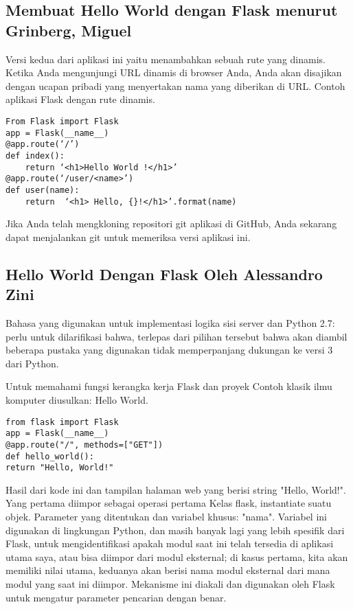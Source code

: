 \documentclass[12pt]{article}
\begin{document}
\subsection{Membuat Hello World dengan Flask menurut Grinberg, Miguel}
Versi kedua dari aplikasi ini yaitu menambahkan sebuah rute yang dinamis. Ketika Anda mengunjungi URL dinamis di browser Anda, Anda akan disajikan dengan ucapan pribadi yang menyertakan nama yang diberikan di URL. Contoh aplikasi Flask dengan rute dinamis.
\begin{verbatim}
From Flask import Flask
app = Flask(__name__)
@app.route(‘/’)
def index():
	return ‘<h1>Hello World !</h1>’
@app.route(‘/user/<name>’)
def user(name):
	return  ‘<h1> Hello, {}!</h1>’.format(name)

\end{verbatim}
Jika Anda telah mengkloning repositori git aplikasi di GitHub, Anda sekarang dapat menjalankan git untuk memeriksa versi aplikasi ini\cite{grinberg2018flask}.

\subsection{Hello World Dengan Flask Oleh Alessandro Zini}

Bahasa yang digunakan untuk implementasi logika sisi server dan Python 2.7: perlu untuk dilarifikasi bahwa, terlepas dari pilihan tersebut bahwa akan diambil beberapa pustaka yang digunakan tidak memperpanjang dukungan ke versi 3 dari Python.

Untuk memahami fungsi kerangka kerja Flask dan proyek Contoh klasik ilmu komputer diusulkan: Hello World.

\begin{verbatim}
from flask import Flask
app = Flask(__name__)
@app.route("/", methods=["GET"])
def hello_world():
return "Hello, World!"
\end{verbatim}

Hasil dari kode ini dan tampilan halaman web yang berisi string "Hello, World!". Yang pertama diimpor sebagai operasi pertama Kelas flask, instantiate suatu objek. Parameter yang ditentukan dan variabel khusus: "nama".  Variabel ini digunakan di lingkungan Python, dan masih banyak lagi yang lebih spesifik dari Flask, untuk mengidentifikasi apakah modul saat ini telah tersedia di aplikasi utama saya, atau bisa diimpor dari modul eksternal; di kasus pertama, kita akan memiliki nilai utama, keduanya akan berisi nama modul eksternal dari mana modul yang saat ini diimpor. Mekanisme ini diakali dan digunakan oleh Flask untuk mengatur parameter pencarian dengan benar\cite{ziniqr}.
\end{document}
